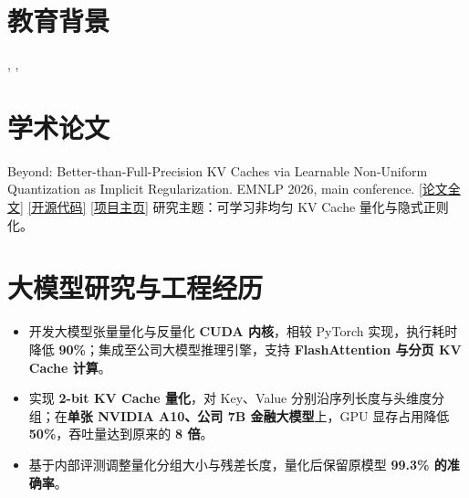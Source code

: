 \documentclass[a4paper,10pt]{article}
\begin{document}
\fontsize{10.25}{14}\selectfont


\section{教育背景}
\sep
{}
\sep
{}

\section{学术论文}
{Beyond: Better-than-Full-Precision KV Caches via Learnable Non-Uniform Quantization as Implicit Regularization.}
{EMNLP 2026, main conference.}
{\href{https://wsxhjnb1.github.io/Beyond-KV-Cache/paper/Beyond.pdf}{\textcolor{accent}{[论文全文]}}
\enspace\href{https://github.com/wsxhjnb1/Beyond-KV-Cache}{\textcolor{accent}{[开源代码]}}
\enspace\href{https://wsxhjnb1.github.io/Beyond-KV-Cache/}{\textcolor{accent}{[项目主页]}}}
研究主题：可学习非均匀 KV Cache 量化与隐式正则化。

\section{大模型研究与工程经历}
\begin{itemize}
  \item 开发大模型张量量化与反量化 \textbf{CUDA 内核}，相较 PyTorch 实现，执行耗时降低 \textbf{90\%}；集成至公司大模型推理引擎，支持 \textbf{FlashAttention 与分页 KV Cache 计算}。
  \item 实现 \textbf{2-bit KV Cache 量化}，对 Key、Value 分别沿序列长度与头维度分组；在\textbf{单张 NVIDIA A10、公司 7B 金融大模型}上，GPU 显存占用降低 \textbf{50\%}，吞吐量达到原来的 \textbf{8 倍}。
  \item 基于内部评测调整量化分组大小与残差长度，量化后保留原模型 \textbf{99.3\% 的准确率}。
\end{itemize}
\end{document}
